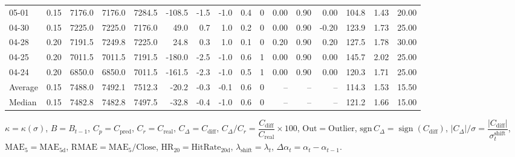 \begin{threeparttable}
{\begin{tabular}{lrrrrrrrrrrrrrrr}
  05-01 &     0.15 & 7176.0 & 7176.0 & 7284.5 &     -108.5 &           -1.5 &                     -1.0 &                 0.4 &              0 &       0.00 &      0.90 &           0.00 &            104.8 &            1.43 &                  20.00 \\
  04-30 &     0.15 & 7225.0 & 7225.0 & 7176.0 &       49.0 &            0.7 &                      1.0 &                 0.2 &              0 &       0.00 &      0.90 &          -0.20 &            123.9 &            1.73 &                  25.00 \\
  04-28 &     0.20 & 7191.5 & 7249.8 & 7225.0 &       24.8 &            0.3 &                      1.0 &                 0.1 &              0 &       0.20 &      0.90 &           0.20 &            127.5 &            1.78 &                  30.00 \\
  04-25 &     0.20 & 7011.5 & 7011.5 & 7191.5 &     -180.0 &           -2.5 &                     -1.0 &                 0.6 &              1 &       0.00 &      0.90 &           0.00 &            145.7 &            2.02 &                  25.00 \\
  04-24 &     0.20 & 6850.0 & 6850.0 & 7011.5 &     -161.5 &           -2.3 &                     -1.0 &                 0.5 &              1 &       0.00 &      0.90 &           0.00 &            120.3 &            1.71 &                  25.00 \\
Average &     0.15 & 7488.0 & 7492.1 & 7512.3 &      -20.2 &           -0.3 &                     -0.1 &                 0.6 &              0 &         -- &        -- &             -- &            114.3 &            1.53 &                  15.50 \\
 Median &     0.15 & 7482.8 & 7482.8 & 7497.5 &      -32.8 &           -0.4 &                     -1.0 &                 0.6 &              0 &         -- &        -- &             -- &            121.2 &            1.66 &                  15.00 \\
\bottomrule
\end{tabular}
}
\begin{tablenotes}\footnotesize
\item $\kappa=\kappa(\sigma)$, $B=B_{t-1}$, $C_p=C_{\text{pred}}$, $C_r=C_{\text{real}}$, $C_\Delta=C_{\text{diff}}$, $C_\Delta/C_r=\dfrac{C_{\text{diff}}}{C_{\text{real}}}\times100$, $\mathrm{Out}=\text{Outlier}$, $\mathrm{sgn}\,C_\Delta=\operatorname{sign}(C_{\text{diff}})$, $|C_\Delta|/\sigma=\dfrac{|C_{\text{diff}}|}{\sigma_t^{\text{shift}}}$, $\mathrm{MAE}_5=\mathrm{MAE}_{5\text{d}}$, $\mathrm{RMAE}= \mathrm{MAE}_5 / \text{Close}$, $\mathrm{HR}_{20}=\mathrm{HitRate}_{20\text{d}}$, 
$\lambda_{\text{shift}}=\lambda_t$, 
$\Delta\alpha_t=\alpha_t-\alpha_{t-1}$.
\end{tablenotes}
\end{threeparttable}
\endgroup

